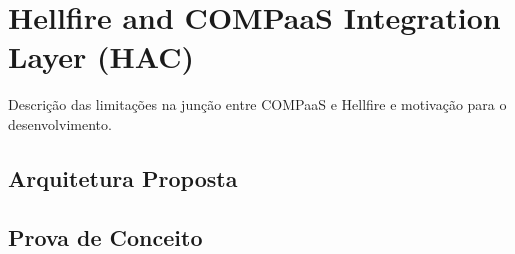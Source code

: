 \section{Hellfire and COMPaaS Integration Layer (HAC)}
\label{sec:HAC}
Descrição das limitações na junção entre COMPaaS e Hellfire e motivação para o desenvolvimento.

\subsection{Arquitetura Proposta}
\subsection{Prova de Conceito}
